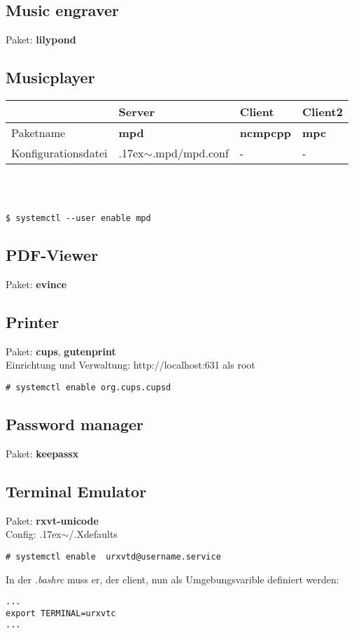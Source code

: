 \subsection{Music engraver}
Paket: \textbf{lilypond}

\subsection{Musicplayer}
\begin{tabular}{l|l|l|l}
~ & Server & Client & Client2 \\ \hline
    Paketname & \textbf{mpd} & \textbf{ncmpcpp} & \textbf{mpc} \\ 
    Konfigurationsdatei & {{\raise.17ex\hbox{$\scriptstyle\mathtt{\sim}$}}.mpd/mpd.conf} & - & - \\
\end{tabular}
\\ \\
\begin{lstlisting}[style=Bash]
$ systemctl --user enable mpd
\end{lstlisting}

\subsection{PDF-Viewer}
Paket: \textbf{evince} 

\subsection{Printer}
Paket: \textbf{cups}, \textbf{gutenprint}\\
Einrichtung und Verwaltung: http://localhost:631 als root \\
\begin{lstlisting}[style=Bash]
# systemctl enable org.cups.cupsd 
\end{lstlisting}

\subsection{Password manager}
Paket: \textbf{keepassx} \\ 

\subsection{Terminal Emulator}
Paket: \textbf{rxvt-unicode} \\ 
Config: {{\raise.17ex\hbox{$\scriptstyle\mathtt{\sim}$}}/.Xdefaults} \\
\begin{lstlisting}[style=Bash]
# systemctl enable  urxvtd@username.service
\end{lstlisting}
In der \emph{.bashrc} muss er, der client, nun als Umgebungsvarible definiert werden:
\begin{lstlisting}[style=Bash]
...
export TERMINAL=urxvtc
...
\end{lstlisting}

